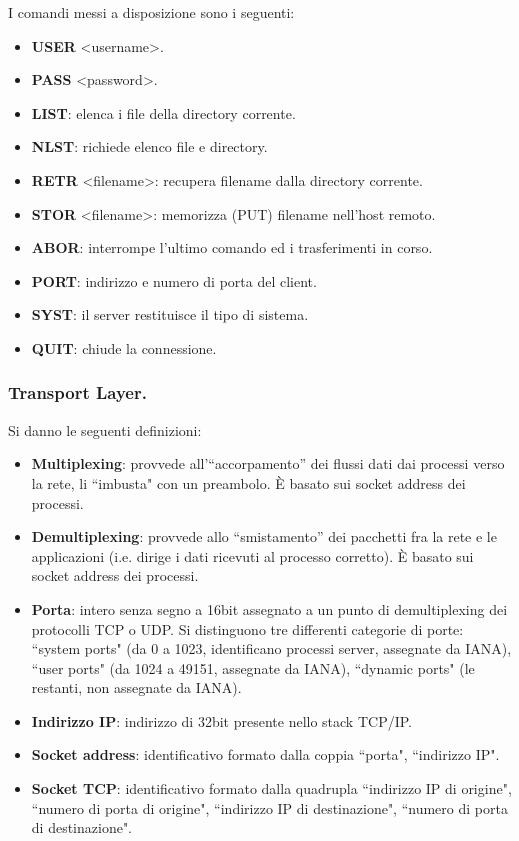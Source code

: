 \documentclass[11pt, italian, openany]{book}
\begin{document}
\begin{sloppypar}
\begin{itemize}[topsep=0pt]
	
	I comandi messi a disposizione sono i seguenti:
	\vspace{-3.5mm}
	\begin{itemize}
		\itemsep -0.3em
		\item \textbf{USER} \textless{username}\textgreater{.}
		\item \textbf{PASS} \textless{password}\textgreater{.}
		\item \textbf{LIST}: elenca i file della directory corrente.
		\item \textbf{NLST}: richiede elenco file e directory.
		\item \textbf{RETR} \textless{filename}\textgreater{:} recupera filename dalla directory corrente.
		\item \textbf{STOR} \textless{filename}\textgreater{:} memorizza (PUT) filename nell'host remoto.
		\item \textbf{ABOR}: interrompe l’ultimo comando ed i trasferimenti in corso.
		\item \textbf{PORT}: indirizzo e numero di porta del client.
		\item \textbf{SYST}: il server restituisce il tipo di sistema.
		\item \textbf{QUIT}: chiude la connessione.
	\end{itemize}
\end{itemize}

\subsubsection*{Transport Layer.}
Si danno le seguenti definizioni:
\begin{itemize}[topsep=0pt]
	\itemsep-0.3em
	\item \textbf{Multiplexing}: provvede all'``accorpamento” dei flussi dati dai processi verso la rete, li ``imbusta" con un preambolo. \`E
	basato sui socket address dei processi.
	\item \textbf{Demultiplexing}: provvede allo ``smistamento” dei pacchetti fra la rete e le applicazioni (i.e. dirige i dati ricevuti al
	processo corretto). \`E basato sui socket address dei processi.
	\item \textbf{Porta}: intero senza segno a 16bit assegnato a un punto di demultiplexing dei protocolli TCP o UDP. Si distinguono tre differenti
	categorie di porte: ``system ports" (da 0 a 1023, identificano processi server, assegnate da IANA), ``user ports" (da 1024 a 49151, assegnate
	da IANA), ``dynamic ports" (le restanti, non assegnate da IANA).
	\item \textbf{Indirizzo IP}: indirizzo di 32bit presente nello stack TCP/IP.
	\item \textbf{Socket address}: identificativo formato dalla coppia ``porta", ``indirizzo IP".
	\item \textbf{Socket TCP}: identificativo formato dalla quadrupla ``indirizzo IP di origine", ``numero di porta di origine", ``indirizzo IP di
	destinazione", ``numero di porta di destinazione".
\end{itemize}


\end{sloppypar}
\end{document}
